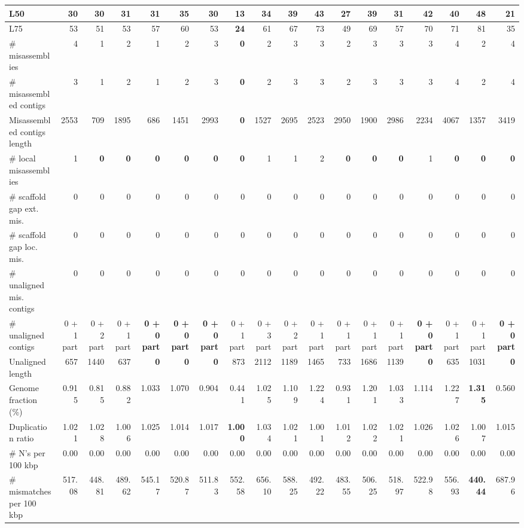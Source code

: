 \documentclass[12pt,a4paper]{article}
\begin{document}
\begin{table}[ht]
\begin{center}
\begin{tabular}{|l*{17}{|r}|}
L50 & 30 & 30 & 31 & 31 & 35 & 30 & {\bf 13} & 34 & 39 & 43 & 27 & 39 & 31 & 42 & 40 & 48 & 21 \\ \hline
L75 & 53 & 51 & 53 & 57 & 60 & 53 & {\bf 24} & 61 & 67 & 73 & 49 & 69 & 57 & 70 & 71 & 81 & 35 \\ \hline
\# misassemblies & 4 & 1 & 2 & 1 & 2 & 3 & {\bf 0} & 2 & 3 & 3 & 2 & 3 & 3 & 3 & 4 & 2 & 4 \\ \hline
\# misassembled contigs & 3 & 1 & 2 & 1 & 2 & 3 & {\bf 0} & 2 & 3 & 3 & 2 & 3 & 3 & 3 & 4 & 2 & 4 \\ \hline
Misassembled contigs length & 2553 & 709 & 1895 & 686 & 1451 & 2993 & {\bf 0} & 1527 & 2695 & 2523 & 2950 & 1900 & 2986 & 2234 & 4067 & 1357 & 3419 \\ \hline
\# local misassemblies & 1 & {\bf 0} & {\bf 0} & {\bf 0} & {\bf 0} & {\bf 0} & {\bf 0} & 1 & 1 & 2 & {\bf 0} & {\bf 0} & {\bf 0} & 1 & {\bf 0} & {\bf 0} & {\bf 0} \\ \hline
\# scaffold gap ext. mis. & 0 & 0 & 0 & 0 & 0 & 0 & 0 & 0 & 0 & 0 & 0 & 0 & 0 & 0 & 0 & 0 & 0 \\ \hline
\# scaffold gap loc. mis. & 0 & 0 & 0 & 0 & 0 & 0 & 0 & 0 & 0 & 0 & 0 & 0 & 0 & 0 & 0 & 0 & 0 \\ \hline
\# unaligned mis. contigs & 0 & 0 & 0 & 0 & 0 & 0 & 0 & 0 & 0 & 0 & 0 & 0 & 0 & 0 & 0 & 0 & 0 \\ \hline
\# unaligned contigs & 0 + 1 part & 0 + 2 part & 0 + 1 part & {\bf 0 + 0 part} & {\bf 0 + 0 part} & {\bf 0 + 0 part} & 0 + 1 part & 0 + 3 part & 0 + 2 part & 0 + 1 part & 0 + 1 part & 0 + 1 part & 0 + 1 part & {\bf 0 + 0 part} & 0 + 1 part & 0 + 1 part & {\bf 0 + 0 part} \\ \hline
Unaligned length & 657 & 1440 & 637 & {\bf 0} & {\bf 0} & {\bf 0} & 873 & 2112 & 1189 & 1465 & 733 & 1686 & 1139 & {\bf 0} & 635 & 1031 & {\bf 0} \\ \hline
Genome fraction (\%) & 0.915 & 0.815 & 0.882 & 1.033 & 1.070 & 0.904 & 0.441 & 1.025 & 1.109 & 1.224 & 0.931 & 1.201 & 1.033 & 1.114 & 1.227 & {\bf 1.315} & 0.560 \\ \hline
Duplication ratio & 1.021 & 1.028 & 1.006 & 1.025 & 1.014 & 1.017 & {\bf 1.000} & 1.034 & 1.021 & 1.001 & 1.012 & 1.022 & 1.021 & 1.026 & 1.026 & 1.007 & 1.015 \\ \hline
\# N's per 100 kbp & 0.00 & 0.00 & 0.00 & 0.00 & 0.00 & 0.00 & 0.00 & 0.00 & 0.00 & 0.00 & 0.00 & 0.00 & 0.00 & 0.00 & 0.00 & 0.00 & 0.00 \\ \hline
\# mismatches per 100 kbp & 517.08 & 448.81 & 489.62 & 545.17 & 520.87 & 511.83 & 552.58 & 656.10 & 588.25 & 492.22 & 483.55 & 506.25 & 518.97 & 522.98 & 556.93 & {\bf 440.44} & 687.96 \\ \hline

\end{tabular}
\end{center}
\end{table}
\end{document}
